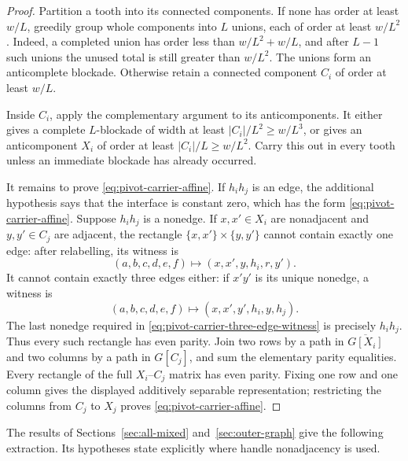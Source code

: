 \documentclass[11pt]{article}
\numberwithin{equation}{section}
\theoremstyle{plain}
\theoremstyle{definition}
\begin{document}
\begin{proof}
Partition a tooth into its connected components.  If none has order
at least $w/L$, greedily group whole components into $L$ unions, each
of order at least $w/L^2$.  Indeed, a completed union has order less
than $w/L^2+w/L$, and after $L-1$ such unions the unused total is still
greater than $w/L^2$.  The unions form an anticomplete blockade.
Otherwise retain a connected component $C_i$ of order at least $w/L$.

Inside $C_i$, apply the complementary argument to its anticomponents.
It either gives a complete $L$-blockade of width at least
$|C_i|/L^2\geq w/L^3$, or gives an anticomponent
$X_i$ of order at least $|C_i|/L\geq w/L^2$.  Carry this out in every
tooth unless an immediate blockade has already occurred.

It remains to prove \eqref{eq:pivot-carrier-affine}.  If $h_ih_j$ is an edge, the additional
hypothesis says that the interface is constant zero, which has the
form \eqref{eq:pivot-carrier-affine}.  Suppose $h_ih_j$ is a nonedge.  If $x,x'\in X_i$ are
nonadjacent and $y,y'\in C_j$ are adjacent, the rectangle
$\{x,x'\}\times\{y,y'\}$ cannot contain exactly one edge: after
relabelling, its witness is
\[
 (a,b,c,d,e,f)\longmapsto(x,x',y,h_i,r,y').
\]
It cannot contain exactly three edges either: if $x'y'$ is its unique
nonedge, a witness is
\begin{equation}
 (a,b,c,d,e,f)\longmapsto(x,x',y',h_i,y,h_j).
 \label{eq:pivot-carrier-three-edge-witness}
\end{equation}
The last nonedge required in
\eqref{eq:pivot-carrier-three-edge-witness} is precisely $h_ih_j$.
Thus every
such rectangle has even parity.  Join two rows by a path in
$\overline{G[X_i]}$ and two columns by a path in $G[C_j]$, and sum the
elementary parity equalities.  Every rectangle of the full
$X_i$--$C_j$ matrix has even parity.  Fixing one row and one column
gives the displayed additively separable representation; restricting the
columns from $C_j$ to $X_j$ proves \eqref{eq:pivot-carrier-affine}.
\end{proof}

The results of Sections~\ref{sec:all-mixed} and~\ref{sec:outer-graph}
give the following extraction.  Its hypotheses state explicitly where
handle nonadjacency is used.
\end{document}
